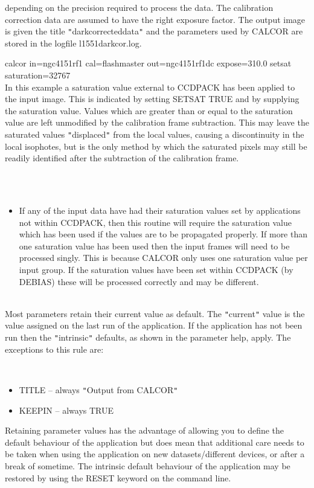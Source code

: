 \documentclass[twoside,11pt]{article}
\newcommand{\htmlref}[2]{#1}
\renewcommand{\_}{\texttt{\symbol{95}}}
\newcommand{\qt}[1]{{\tt "}#1{\tt "}}
\newcommand{\routine}[1]{{\sc #1}}
\newcommand{\xroutine}[1]{\htmlref{{\sc #1}}{#1}}
\newcommand{\sstexamplesubsection}[2]{\sloppy \item{\ssttt #1} \mbox{} \\ #2 }
\newcommand{\sstnotes}[1]{\item[Notes:] \mbox{} \\[1.3ex] #1}
\newcommand{\sstdiytopic}[2]{\item[#1:] \mbox{} \\[1.3ex] #2}
\newcommand{\sstitemlist}[1]{
  \mbox{} \\
  \vspace{-3.5ex}
  \begin{itemize}
     #1
  \end{itemize}
}
\newcommand{\sstitem}{\item}
\newcommand{\sstexamplesubsection}[2]{\item[{\ssttt #1}] #2}
\newcommand{\sstnotes}[1]{\item[Notes:] #1 }
\newcommand{\sstdiytopic}[2]{\item[{#1}] #2 }
\newcommand{\sstitemlist}[1]{
      \begin{itemize}
         #1
      \end{itemize}
      \\
   }
\newcommand{\sstitem}{\item}
\begin{document}
{{{         depending on the precision required to process the data. The
         calibration correction data are assumed to have the right
         exposure factor. The output image is given the title
         \qt{dark\_corrected\_data} and the parameters used by \routine{CALCOR}
         are
         stored in the logfile l1551\_darkcor.log.
      }
      \sstexamplesubsection{
         calcor in=ngc4151r\_f1 cal=flash\_master out=ngc4151r\_f1\_dc
             expose=310.0 setsat saturation=32767
      } {
         In this example a saturation value external to CCDPACK has
         been applied to the input image. This is indicated by setting
         SETSAT TRUE and by supplying the saturation value. Values
         which are greater than or equal to the saturation value are
         left unmodified by the calibration frame subtraction. This may
         leave the saturated values \qt{displaced} from the local values,
         causing a discontinuity in the local isophotes, but is the
         only method by which the saturated pixels may still be
         readily identified after the subtraction of the calibration
         frame.
      }
   }
   \sstnotes{
      \sstitemlist{

         \sstitem
         If any of the input data have had their saturation values set
           by applications not within CCDPACK, then this routine will
           require the saturation value which has been used if the values
           are to be propagated properly. If more than one saturation
           value has been used then the input frames will need to be
           processed singly. This is because \routine{CALCOR} only uses one
           saturation value per input group. If the saturation values
           have been set within CCDPACK (by \xroutine{DEBIAS}) these will be
           processed correctly and may be different.
      }
   }
   \sstdiytopic{
      Behaviour of parameters
   } {
      Most parameters retain their current value as default. The
      \qt{current} value is the value assigned on the last run of the
      application. If the application has not been run then the
      \qt{intrinsic} defaults, as shown in the parameter help, apply.
      The exceptions to this rule are:
      \sstitemlist{

         \sstitem
            TITLE   -- always \qt{Output from CALCOR}

         \sstitem
            KEEPIN  -- always TRUE

      }
      Retaining parameter values has the advantage of allowing you to
      define the default behaviour of the application but does mean
      that additional care needs to be taken when using the application
      on new datasets/different devices, or after a break of sometime.
      The intrinsic default behaviour of the application may be
      restored by using the RESET keyword on the command line.

}}
\end{document}

